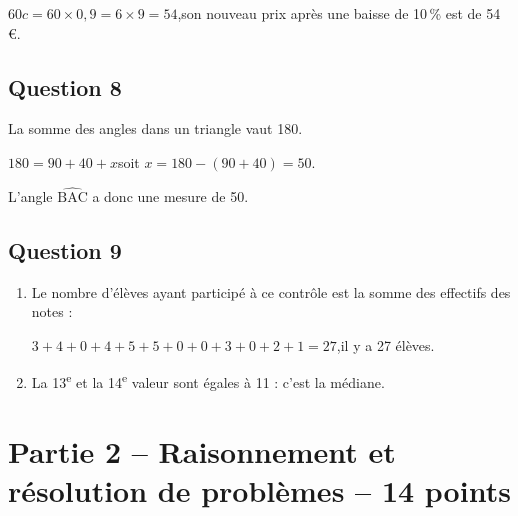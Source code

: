\documentclass[12pt,a4paper,french]{article}
\providecommand{\up}{\textsuperscript}
\begin{document}
		$60c = 60 \times 0,9 = 6 \times 9 = 54$,\quad son nouveau prix après une baisse de 10\,\% est de 54 \euro{}.

	\subsection*{Question 8}
		La somme des angles dans un triangle vaut 180\textdegree.

		$180 = 90+ 40 + x$\quad soit \quad $x =180 -(90+40)=50$.

		L'angle $\widehat{\mathrm{BAC}}$ a donc une mesure de 50\textdegree.

	\subsection*{Question 9}

\begin{enumerate}[label=\textbf{\alph*.},left=5mm]
\item Le nombre d'élèves ayant participé à ce contrôle est la somme des effectifs des notes :

$3+4+0+4+5+5+0+0+3+0+2+1=27$,\quad il y a 27 élèves.

\item %
La 13\up{e} et la 14\up{e} valeur sont égales à 11 : c'est la médiane.
%

		\end{enumerate}
		\newpage

\section*{Partie 2 -- Raisonnement et résolution de problèmes -- 14 points}
\end{document}
